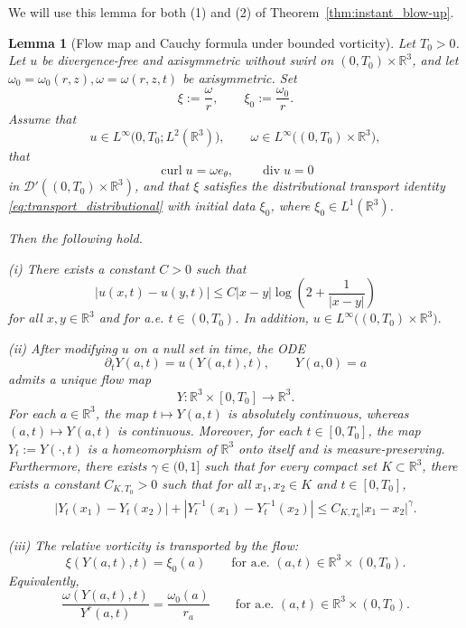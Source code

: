 \documentclass[reqno,11pt]{amsart}
\newtheorem{lemma}[theorem]{Lemma}
\begin{document}
We will use this lemma for both (1) and (2) of Theorem~\ref{thm:instant_blow-up}.
\begin{lemma}[Flow map and Cauchy formula under bounded vorticity]
\label{lem:flow_cauchy_bd}
Let $T_0>0$. Let $u$ be divergence-free and axisymmetric without swirl on $(0,T_0)\times\mathbb R^3$, and
let $\omega_0=\omega_0(r,z), \omega=\omega(r,z,t)$ be axisymmetric. Set
\[
\xi:=\frac{\omega}{r},\qquad \xi_0:=\frac{\omega_0}{r}.
\]
Assume that
\[
u\in L^\infty\bigl(0,T_0;L^2(\mathbb R^3)\bigr),
\qquad
\omega\in L^\infty\bigl((0,T_0)\times\mathbb R^3\bigr),
\]
that
\[
\operatorname{curl}u=\omega e_\theta,
\qquad
\operatorname{div}u=0
\]
in $\mathcal D'((0,T_0)\times\mathbb R^3)$, and that $\xi$ satisfies the distributional
transport identity \eqref{eq:transport_distributional} with initial data $\xi_0$,
where $\xi_0\in L^1(\mathbb R^3)$.

Then the following hold.

\smallskip
\noindent
(i) There exists a constant $C>0$ such that
\begin{equation}
\label{eq:u_log_Lip_common}
|u(x,t)-u(y,t)|
\le
C |x-y|\log\!\left(2+\frac{1}{|x-y|}\right)
\end{equation}
for all $x,y\in\mathbb R^3$ and for a.e. $t\in(0,T_0)$. In addition, $u\in L^\infty\bigl((0,T_0)\times\mathbb R^3\bigr).$

\smallskip
\noindent
(ii) After modifying $u$ on a null set in time, the ODE
\[
\partial_t Y(a,t)=u(Y(a,t),t),
\qquad
Y(a,0)=a
\]
admits a unique flow map
\[
Y:\mathbb R^3\times[0,T_0]\to\mathbb R^3.
\]
For each $a\in\mathbb R^3$, the map $t\mapsto Y(a,t)$ is absolutely continuous,
whereas $(a,t)\mapsto Y(a,t)$ is continuous. Moreover, for each
$t\in[0,T_0]$, the map $Y_t:=Y(\cdot,t)$ is a homeomorphism of $\mathbb R^3$
onto itself and is measure-preserving. Furthermore, 
there exists $\gamma\in(0,1]$ such that 
for every compact set
$K\subset\mathbb R^3$,  there exists a constant $C_{K,T_0}>0$ such
that for all $
x_1,x_2\in K$ and $t\in[0,T_0]$,
\begin{align}
\label{eq:Y_reg_x_common}
\begin{aligned}
|Y_t(x_1)-Y_t(x_2)|
+
|Y_t^{-1}(x_1)-Y_t^{-1}(x_2)|
\le
C_{K,T_0} |x_1-x_2|^\gamma.
\end{aligned}
\end{align}


\smallskip
\noindent
(iii) The relative vorticity is transported by the flow:
\begin{equation}
\label{eq:cauchy_xi_common}
\xi(Y(a,t),t)=\xi_0(a)
\qquad
\text{for a.e. }(a,t)\in\mathbb R^3\times(0,T_0).
\end{equation}
Equivalently,
\begin{equation}
\label{eq:cauchy_omega_common}
\frac{\omega(Y(a,t),t)}{Y^r(a,t)}
=
\frac{\omega_0(a)}{r_a}
\qquad
\text{for a.e. }(a,t)\in\mathbb R^3\times(0,T_0).
\end{equation}


\end{lemma}
\end{document}
